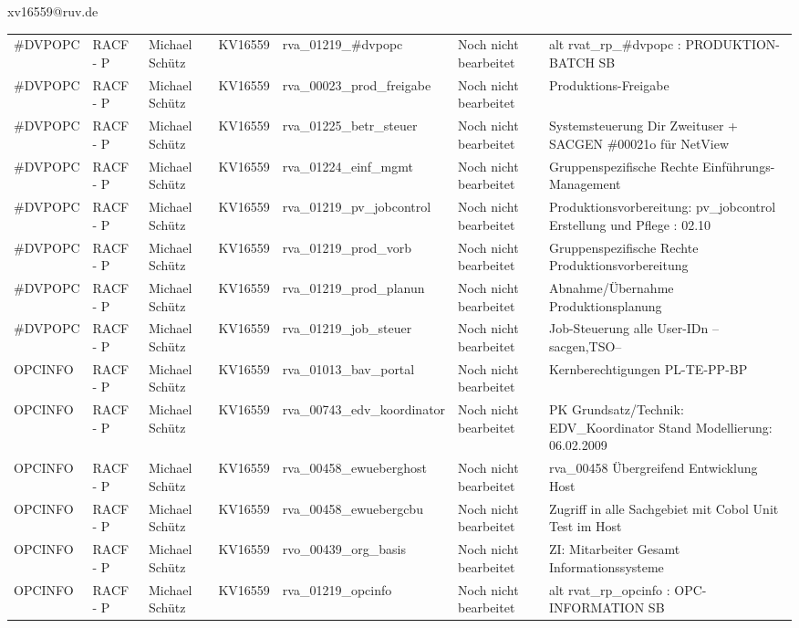 \documentclass[a4paper,landscape,12pt]{letter}
\begin{document}
\begin{letter}{xv16559@ruv.de\hfill \break}
\begin{tiny}
\begin{longtable}{|p{35mm}|p{15mm}|p{25mm}|p{10mm}|p{40mm}|p{50mm}|p{50mm}|}
\#DVPOPC & RACF - P & Michael Schütz & KV16559 & rva\_01219\_\#dvpopc & Noch nicht bearbeitet & alt rvat\_rp\_\#dvpopc          : PRODUKTION-BATCH SB \\
\#DVPOPC & RACF - P & Michael Schütz & KV16559 & rva\_00023\_prod\_freigabe & Noch nicht bearbeitet & Produktions-Freigabe \\
\#DVPOPC & RACF - P & Michael Schütz & KV16559 & rva\_01225\_betr\_steuer & Noch nicht bearbeitet & Systemsteuerung Dir Zweituser + SACGEN \#00021o für NetView \\
\#DVPOPC & RACF - P & Michael Schütz & KV16559 & rva\_01224\_einf\_mgmt & Noch nicht bearbeitet & Gruppenspezifische Rechte Einführungs-Management \\
\#DVPOPC & RACF - P & Michael Schütz & KV16559 & rva\_01219\_pv\_jobcontrol & Noch nicht bearbeitet & Produktionsvorbereitung: pv\_jobcontrol Erstellung und Pflege : 02.10 \\
\#DVPOPC & RACF - P & Michael Schütz & KV16559 & rva\_01219\_prod\_vorb & Noch nicht bearbeitet & Gruppenspezifische Rechte Produktionsvorbereitung \\
\#DVPOPC & RACF - P & Michael Schütz & KV16559 & rva\_01219\_prod\_planun & Noch nicht bearbeitet & Abnahme/Übernahme Produktionsplanung \\
\#DVPOPC & RACF - P & Michael Schütz & KV16559 & rva\_01219\_job\_steuer & Noch nicht bearbeitet & Job-Steuerung alle User-IDn --sacgen,TSO-- \\
OPCINFO & RACF - P & Michael Schütz & KV16559 & rva\_01013\_bav\_portal & Noch nicht bearbeitet & Kernberechtigungen PL-TE-PP-BP \\
OPCINFO & RACF - P & Michael Schütz & KV16559 & rva\_00743\_edv\_koordinator & Noch nicht bearbeitet & PK Grundsatz/Technik: EDV\_Koordinator Stand Modellierung: 06.02.2009 \\
OPCINFO & RACF - P & Michael Schütz & KV16559 & rva\_00458\_ewueberghost & Noch nicht bearbeitet & rva\_00458 Übergreifend Entwicklung Host \\
OPCINFO & RACF - P & Michael Schütz & KV16559 & rva\_00458\_ewuebergcbu & Noch nicht bearbeitet & Zugriff in alle Sachgebiet mit Cobol Unit Test im Host \\
OPCINFO & RACF - P & Michael Schütz & KV16559 & rvo\_00439\_org\_basis & Noch nicht bearbeitet & ZI: Mitarbeiter Gesamt Informationssysteme \\
OPCINFO & RACF - P & Michael Schütz & KV16559 & rva\_01219\_opcinfo & Noch nicht bearbeitet & alt rvat\_rp\_opcinfo          : OPC- INFORMATION                         SB \\


\end{longtable}
\end{tiny}
\end{letter}
\end{document}
